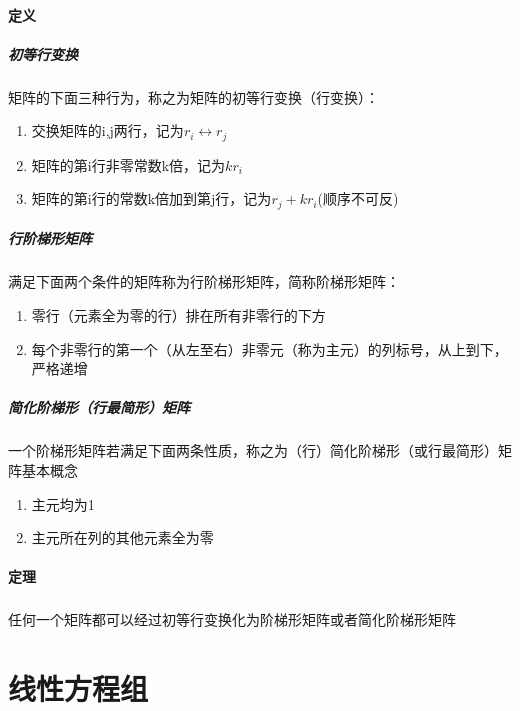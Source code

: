 \documentclass[UTF-8,a4paper]{ctexart}
\begin{document}
\subsection{定义}
\subsubsection{初等行变换}
\kaishu 矩阵的下面三种行为，称之为矩阵的初等行变换（行变换）：
\begin{enumerate}
    \item 交换矩阵的i,j两行，记为\(r_i \leftrightarrow r_j \)
    \item 矩阵的第i行非零常数k倍，记为\(kr_i\)
    \item 矩阵的第i行的常数k倍加到第j行，记为\(r_j+kr_i\)(顺序不可反)
\end{enumerate}

\subsubsection{行阶梯形矩阵}
满足下面两个条件的矩阵称为行阶梯形矩阵，简称阶梯形矩阵：
\begin{enumerate}
    \item 零行（元素全为零的行）排在所有非零行的下方
    \item 每个非零行的第一个（从左至右）非零元（称为主元）的列标号，从上到下，严格递增
\end{enumerate}

\subsubsection{简化阶梯形（行最简形）矩阵}
一个阶梯形矩阵若满足下面两条性质，称之为（行）简化阶梯形（或行最简形）矩阵基本概念
\begin{enumerate}
    \item 主元均为1
    \item 主元所在列的其他元素全为零
\end{enumerate}

\subsection{定理}
\subsubsection{} 任何一个矩阵都可以经过初等行变换化为阶梯形矩阵或者简化阶梯形矩阵




\part{线性方程组}
\end{document}
